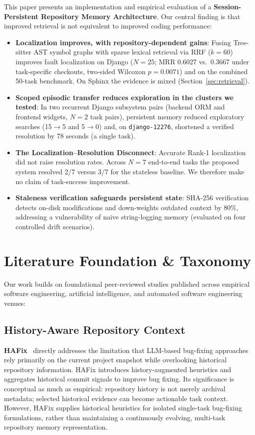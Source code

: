 \documentclass[conference]{IEEEtran}
\begin{document}
This paper presents an implementation and empirical evaluation of a \textbf{Session-Persistent Repository Memory Architecture}. Our central finding is that improved retrieval is not equivalent to improved coding performance:
\begin{itemize}
    \item \textbf{Localization improves, with repository-dependent gains}: Fusing Tree-sitter AST symbol graphs with sparse lexical retrieval via RRF ($k=60$) improves fault localization on Django ($N=25$; MRR 0.6027 vs.\ 0.3667 under task-specific checkouts, two-sided Wilcoxon $p=0.0071$) and on the combined 50-task benchmark. On Sphinx the evidence is mixed (Section~\ref{sec:retrieval}).
    \item \textbf{Scoped episodic transfer reduces exploration in the clusters we tested}: In two recurrent Django subsystem pairs (backend ORM and frontend widgets, $N=2$ task pairs), persistent memory reduced exploratory searches (15$\to$5 and 5$\to$0) and, on \texttt{django-12276}, shortened a verified resolution by 78 seconds (a single task).
    \item \textbf{The Localization--Resolution Disconnect}: Accurate Rank-1 localization did not raise resolution rates. Across $N=7$ end-to-end tasks the proposed system resolved 2/7 versus 3/7 for the stateless baseline. We therefore make no claim of task-success improvement.
    \item \textbf{Staleness verification safeguards persistent state}: SHA-256 verification detects on-disk modifications and down-weights outdated context by 80\%, addressing a vulnerability of naive string-logging memory (evaluated on four controlled drift scenarios).
\end{itemize}

\section{Literature Foundation \& Taxonomy}
Our work builds on foundational peer-reviewed studies published across empirical software engineering, artificial intelligence, and automated software engineering venues:

\subsection{History-Aware Repository Context}
\textbf{HAFix}~\cite{shi2026hafix} directly addresses the limitation that LLM-based bug-fixing approaches rely primarily on the current project snapshot while overlooking historical repository information. HAFix introduces history-augmented heuristics and aggregates historical commit signals to improve bug fixing. Its significance is conceptual as much as empirical: repository history is not merely archival metadata; selected historical evidence can become actionable task context. However, HAFix supplies historical heuristics for isolated single-task bug-fixing formulations, rather than maintaining a continuously evolving, multi-task repository memory representation.
\end{document}
